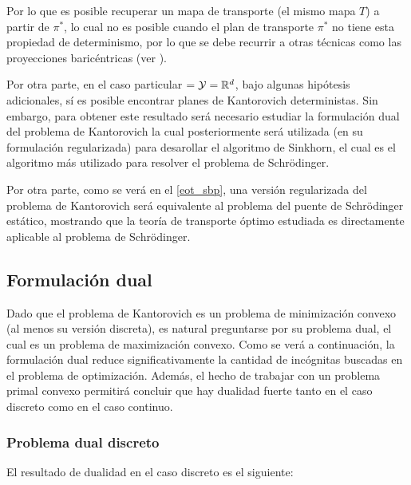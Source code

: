 Por lo que es posible recuperar un mapa de transporte (el mismo mapa $T$) a partir de $\pi^*$, lo cual no es posible cuando el plan de transporte $\pi^*$ no tiene esta propiedad de determinismo, por lo que se debe recurrir a otras técnicas como las proyecciones baricéntricas (ver \cite{peyré2020computational}).

Por otra parte, en el caso particular $=\mathcal{Y}=\mathbb{R}^d$, bajo algunas hipótesis adicionales, sí es posible encontrar planes de Kantorovich deterministas. Sin embargo, para obtener este resultado será necesario estudiar la formulación dual del problema de Kantorovich la cual posteriormente será utilizada (en su formulación regularizada) para desarollar el algoritmo de Sinkhorn, el cual es el algoritmo más utilizado para resolver el problema de Schrödinger.

Por otra parte, como se verá en el \autoref{eot_sbp}, una versión regularizada del problema de Kantorovich será equivalente al problema del puente de Schrödinger estático, mostrando que la teoría de transporte óptimo estudiada es directamente aplicable al problema de Schrödinger.

\subsection{Formulación dual}
\label{ot/kantorovich/dual}

Dado que el problema de Kantorovich es un problema de minimización convexo (al menos su versión discreta), es natural preguntarse por su problema dual, el cual es un problema de maximización convexo. Como se verá a continuación, la formulación dual reduce significativamente la cantidad de incógnitas buscadas en el problema de optimización. Además, el hecho de trabajar con un problema primal convexo permitirá concluir que hay dualidad fuerte tanto en el caso discreto como en el caso continuo.

\subsubsection{Problema dual discreto}

El resultado de dualidad en el caso discreto es el siguiente:


